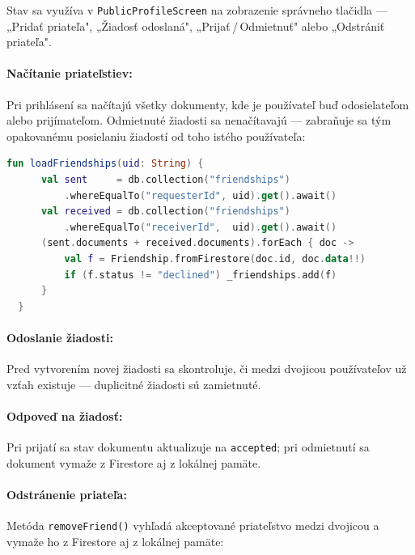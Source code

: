   Stav sa využíva v \texttt{PublicProfileScreen} na zobrazenie správneho
  tlačidla — „Pridať priateľa", „Žiadosť odoslaná", „Prijať\,/\,Odmietnuť"
  alebo „Odstrániť priateľa".

  \paragraph{Načítanie priateľstiev:}
  Pri prihlásení sa načítajú všetky dokumenty, kde je používateľ buď
  odosielateľom alebo prijímateľom. Odmietnuté žiadosti sa nenačítavajú —
  zabraňuje sa tým opakovanému posielaniu žiadostí od toho istého
  používateľa:

  \begin{lstlisting}[language=Kotlin, caption=Načítanie priateľstiev z Firestore]
  fun loadFriendships(uid: String) {
      val sent     = db.collection("friendships")
          .whereEqualTo("requesterId", uid).get().await()
      val received = db.collection("friendships")
          .whereEqualTo("receiverId",  uid).get().await()
      (sent.documents + received.documents).forEach { doc ->
          val f = Friendship.fromFirestore(doc.id, doc.data!!)
          if (f.status != "declined") _friendships.add(f)
      }
  }
  \end{lstlisting}

  \paragraph{Odoslanie žiadosti:}
  Pred vytvorením novej žiadosti sa skontroluje, či medzi dvojicou
  používateľov už vzťah existuje — duplicitné žiadosti sú zamietnuté.

  \paragraph{Odpoveď na žiadosť:}
  Pri prijatí sa stav dokumentu aktualizuje na \texttt{accepted}; pri odmietnutí
  sa dokument vymaže z Firestore aj z lokálnej pamäte.

  \iffalse                                                                                                                                                                                                                         
  \paragraph{Odstránenie priateľa:}
  Metóda \texttt{removeFriend()} vyhľadá akceptované priateľstvo medzi
  dvojicou a vymaže ho z Firestore aj z lokálnej pamäte:

